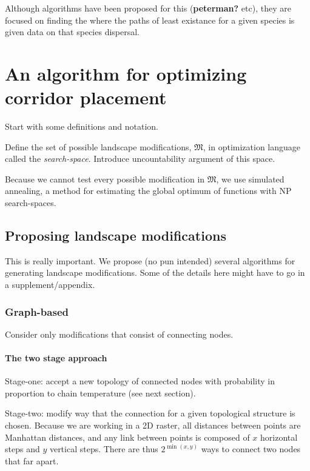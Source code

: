 \documentclass[11pt]{article}
\begin{document}
Although algorithms have been proposed for this (\textbf{peterman?}
etc), they are focused on finding the where the paths of least existance
for a given species is given data on that species dispersal.

\hypertarget{an-algorithm-for-optimizing-corridor-placement}{%
\section{An algorithm for optimizing corridor
placement}\label{an-algorithm-for-optimizing-corridor-placement}}

Start with some definitions and notation.

Define the set of possible landscape modifications, \(\mathfrak{M}\), in
optimization language called the \emph{search-space}. Introduce
uncountability argument of this space.

Because we cannot test every possible modification in \(\mathfrak{M}\),
we use simulated annealing, a method for estimating the global optimum
of functions with NP search-spaces.

\hypertarget{proposing-landscape-modifications}{%
\subsection{Proposing landscape
modifications}\label{proposing-landscape-modifications}}

This is really important. We propose (no pun intended) several
algorithms for generating landscape modifications. Some of the details
here might have to go in a supplement/appendix.

\hypertarget{graph-based}{%
\subsubsection{Graph-based}\label{graph-based}}

Consider only modifications that consist of connecting nodes.

\hypertarget{the-two-stage-approach}{%
\paragraph{The two stage approach}\label{the-two-stage-approach}}

Stage-one: accept a new topology of connected nodes with probability in
proportion to chain temperature (see next section).

Stage-two: modify way that the connection for a given topological
structure is chosen. Because we are working in a 2D raster, all
distances between points are Manhattan distances, and any link between
points is composed of \(x\) horizontal steps and \(y\) vertical steps.
There are thus \(2^{\min(x,y)}\) ways to connect two nodes that far
apart.
\end{document}
